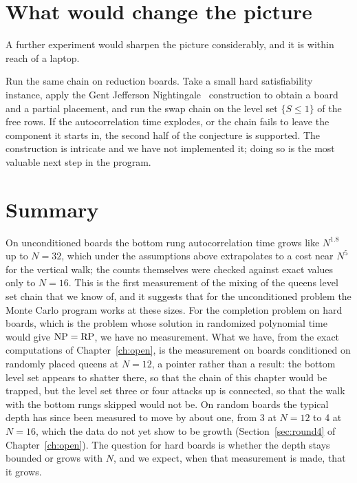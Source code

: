 \section{What would change the picture}

A further experiment would sharpen the picture considerably, and it is within reach of a laptop.

Run the same chain on reduction boards. Take a small hard satisfiability instance, apply the Gent Jefferson Nightingale~\cite{GJN} construction to obtain a board and a partial placement, and run the swap chain on the level set $\{ S \le 1 \}$ of the free rows. If the autocorrelation time explodes, or the chain fails to leave the component it starts in, the second half of the conjecture is supported. The construction is intricate and we have not implemented it; doing so is the most valuable next step in the program.

\section{Summary}

On unconditioned boards the bottom rung autocorrelation time grows like $N^{1.8}$ up to $N = 32$, which under the assumptions above extrapolates to a cost near $N^5$ for the vertical walk; the counts themselves were checked against exact values only to $N = 16$. This is the first measurement of the mixing of the queens level set chain that we know of, and it suggests that for the unconditioned problem the Monte Carlo program works at these sizes. For the completion problem on hard boards, which is the problem whose solution in randomized polynomial time would give $\mathrm{NP} = \mathrm{RP}$, we have no measurement. What we have, from the exact computations of Chapter~\ref{ch:open}, is the measurement on boards conditioned on randomly placed queens at $N = 12$, a pointer rather than a result: the bottom level set appears to shatter there, so that the chain of this chapter would be trapped, but the level set three or four attacks up is connected, so that the walk with the bottom rungs skipped would not be. On random boards the typical depth has since been measured to move by about one, from 3 at $N = 12$ to 4 at $N = 16$, which the data do not yet show to be growth (Section~\ref{sec:round4} of Chapter~\ref{ch:open}). The question for hard boards is whether the depth stays bounded or grows with $N$, and we expect, when that measurement is made, that it grows.
